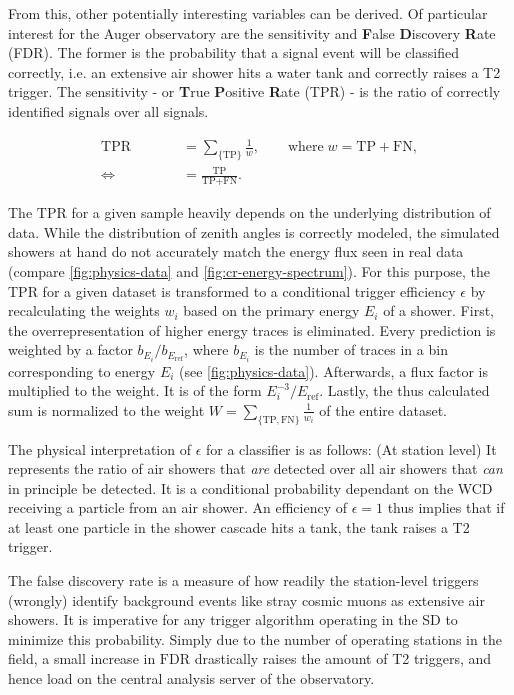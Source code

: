 From this, other potentially interesting variables can be derived. Of particular interest for the Auger observatory are the sensitivity and \textbf{F}alse 
\textbf{D}iscovery \textbf{R}ate (FDR). The former is the probability that a signal event will be classified correctly, i.e. an extensive air shower hits a 
water tank and correctly raises a T2 trigger. The sensitivity - or \textbf{T}rue \textbf{P}ositive \textbf{R}ate (TPR) - is the ratio of correctly identified
signals over all signals.

\begin{align}
	\label{eq:statistics-efficiency}
	\text{TPR} &= \sum\limits_{\{\text{TP}\}} \frac{1}{w}, \qquad\text{where}\;w = \text{TP} + \text{FN}, \\
	\Leftrightarrow \qquad\qquad &= \frac{\text{TP}}{\text{TP} + \text{FN}}.
\end{align}

The $\text{TPR}$ for a given sample heavily depends on the underlying distribution of data. While the distribution of zenith angles is correctly modeled, the 
simulated showers at hand do not accurately match the energy flux seen in real data (compare \autoref{fig:physics-data} and \autoref{fig:cr-energy-spectrum}). For
this purpose, the TPR for a given dataset is transformed to a conditional trigger efficiency $\epsilon$ by recalculating the weights $w_i$ based on the primary 
energy $E_i$ of a shower. First, the overrepresentation of higher energy traces is eliminated. Every prediction is weighted by a factor 
$b_{E_i}/b_{E_\text{ref}}$, where $b_{E_i}$ is the number of traces in a bin corresponding to energy $E_i$ (see \autoref{fig:physics-data}). Afterwards, a flux 
factor is multiplied to the weight. It is of the form $E_i^{-3}/{E_\text{ref}}$. Lastly, the thus calculated sum is normalized to the weight 
$W = \sum\limits_{\{\text{TP}, \text{FN}\}} \frac{1}{w_i}$ of the entire dataset.

The physical interpretation of $\epsilon$ for a classifier is as follows: (At station level) It represents the ratio of air showers that \textit{are} detected over
all air showers that \textit{can} in principle be detected. It is a conditional probability dependant on the WCD receiving a particle from an air shower. An 
efficiency of $\epsilon = 1$ thus implies that if at least one particle in the shower cascade hits a tank, the tank raises a T2 trigger.

The false discovery rate is a measure of how readily the station-level triggers (wrongly) identify background events like stray cosmic muons as extensive air 
showers. It is imperative for any trigger algorithm operating in the SD to minimize this probability. Simply due to the number of operating stations in the field, 
a small increase in $\text{FDR}$ drastically raises the amount of T2 triggers, and hence load on the central analysis server of the observatory.


